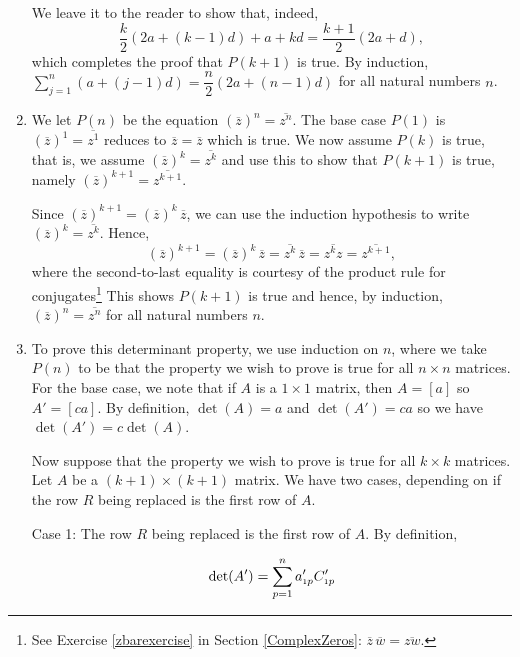 \documentclass{ximera}
\begin{document}
\begin{ex}
\begin{enumerate}
We leave it  to the reader to show that, indeed, \[\frac{k}{2}(2a + (k-1)d) + a + kd = \frac{k+1}{2}(2a+d),\] which completes the proof that $P(k+1)$ is true.  By induction, $\displaystyle{\sum_{j=1}^{n} (a + (j-1)d) = \dfrac{n}{2}(2a + (n-1)d)}$ for all natural numbers $n$.

\item  We let $P(n)$ be the equation $\left(\overline{z}\right)^n = \overline{z^{n}}$.  The base case $P(1)$ is $\left(\overline{z}\right)^1 = \overline{z^{1}}$ reduces to $\overline{z} = \overline{z}$ which is true.  We now assume $P(k)$ is true, that is, we assume $\left(\overline{z}\right)^k = \overline{z^{k}}$ and use this to show that $P(k+1)$ is true, namely  $\left(\overline{z}\right)^{k+1} = \overline{z^{k+1}}$.  

\smallskip

Since $\left(\overline{z}\right)^{k+1} = \left(\overline{z}\right)^{k} \, \overline{z}$, we can use the induction hypothesis to write $\left(\overline{z}\right)^k = \overline{z^{k}}$.  Hence,  \[\left(\overline{z}\right)^{k+1} = \left(\overline{z}\right)^{k} \, \overline{z} =  \overline{z^{k}} \, \overline{z} = \overline{z^{k} z} = \overline{z^{k+1}}, \]  where the second-to-last equality is courtesy of the product rule for conjugates\footnote{See Exercise \ref{zbarexercise} in Section \ref{ComplexZeros}:  $\overline{z} \, \overline{w} = \overline{zw}$.}  This shows $P(k+1)$ is true and hence, by induction, $\left(\overline{z}\right)^n = \overline{z^{n}}$ for all natural numbers $n$.

\item  To prove this determinant property, we use induction on $n$, where we take $P(n)$ to be that the property we wish to prove is true for all $n \times n$ matrices. For the base case, we note that if $A$ is a $1 \times 1$ matrix, then $A = [a]$ so $A' = [ca]$.  By definition, $\det(A) = a$ and $\det(A') = ca$ so we have $\det(A') = c \det(A)$.

\smallskip

Now suppose that the property we wish to prove is true for all $k \times k$ matrices.  Let $A$ be a $(k+1) \times (k+1)$ matrix.  We have two cases, depending on if the row $R$ being replaced is the first row of $A$.  

{ \sc Case 1: } The row $R$ being replaced is the first row of $A$. By definition,

\[ \det(A') = \displaystyle{\sum_{p=1}^{n} a'_{\mbox{\tiny$1$}p} C'_{\mbox{\tiny$1$}p}}\]


\end{enumerate}
\end{ex}
\end{document}
